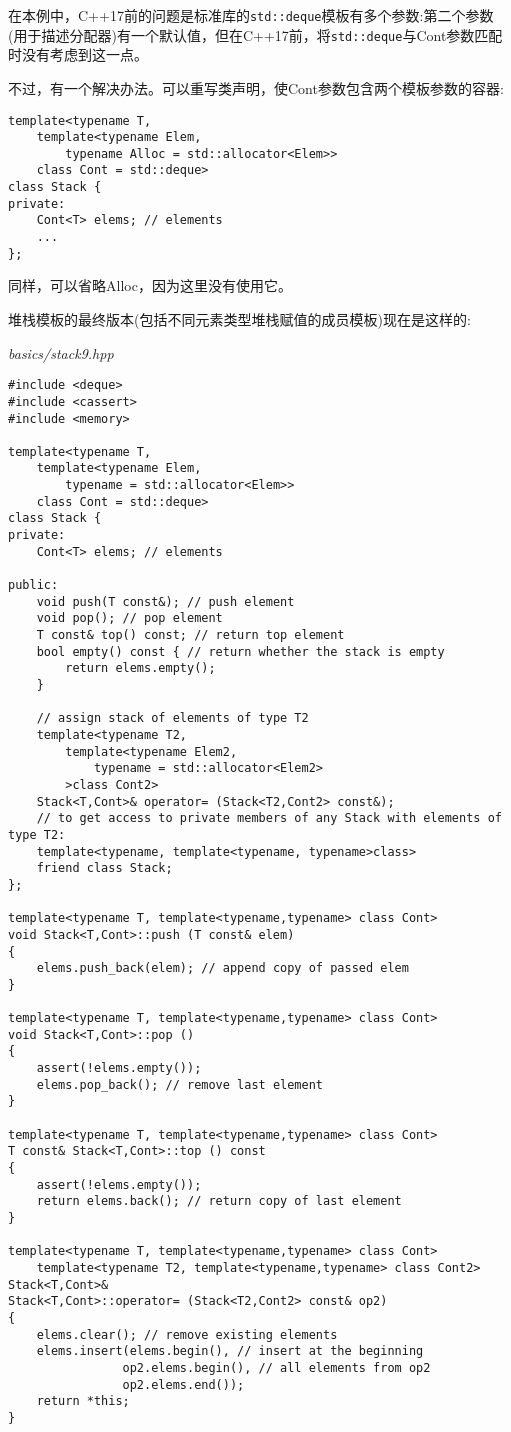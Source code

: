 在本例中，C++17前的问题是标准库的\texttt{std::deque}模板有多个参数:第二个参数(用于描述分配器)有一个默认值，但在C++17前，将\texttt{std::deque}与Cont参数匹配时没有考虑到这一点。

不过，有一个解决办法。可以重写类声明，使Cont参数包含两个模板参数的容器:

\begin{lstlisting}[style=styleCXX]
template<typename T,
	template<typename Elem,
		typename Alloc = std::allocator<Elem>>
	class Cont = std::deque>
class Stack {
private:
	Cont<T> elems; // elements
	...
};
\end{lstlisting}

同样，可以省略Alloc，因为这里没有使用它。

堆栈模板的最终版本(包括不同元素类型堆栈赋值的成员模板)现在是这样的:

\noindent
\textit{basics/stack9.hpp}
\begin{lstlisting}[style=styleCXX]
#include <deque>
#include <cassert>
#include <memory>

template<typename T,
	template<typename Elem,
		typename = std::allocator<Elem>>
	class Cont = std::deque>
class Stack {
private:
	Cont<T> elems; // elements
	
public:
	void push(T const&); // push element
	void pop(); // pop element
	T const& top() const; // return top element
	bool empty() const { // return whether the stack is empty
		return elems.empty();
	}

	// assign stack of elements of type T2
	template<typename T2,
		template<typename Elem2,
			typename = std::allocator<Elem2>
		>class Cont2>
	Stack<T,Cont>& operator= (Stack<T2,Cont2> const&);
	// to get access to private members of any Stack with elements of type T2:
	template<typename, template<typename, typename>class>
	friend class Stack;
};

template<typename T, template<typename,typename> class Cont>
void Stack<T,Cont>::push (T const& elem)
{
	elems.push_back(elem); // append copy of passed elem
}

template<typename T, template<typename,typename> class Cont>
void Stack<T,Cont>::pop ()
{
	assert(!elems.empty());
	elems.pop_back(); // remove last element
}

template<typename T, template<typename,typename> class Cont>
T const& Stack<T,Cont>::top () const
{
	assert(!elems.empty());
	return elems.back(); // return copy of last element
}

template<typename T, template<typename,typename> class Cont>
	template<typename T2, template<typename,typename> class Cont2>
Stack<T,Cont>&
Stack<T,Cont>::operator= (Stack<T2,Cont2> const& op2)
{
	elems.clear(); // remove existing elements
	elems.insert(elems.begin(), // insert at the beginning
				op2.elems.begin(), // all elements from op2
				op2.elems.end());
	return *this;
}
\end{lstlisting}

